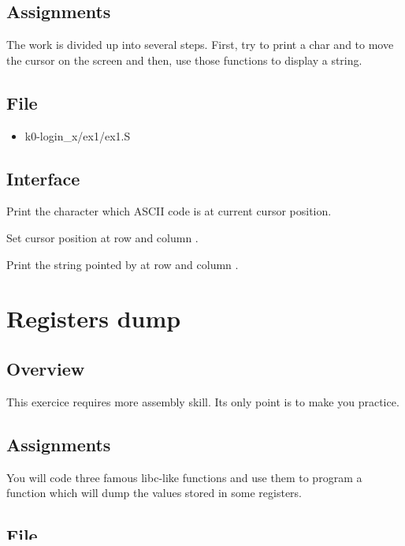 \subsection*{Assignments}
The work is divided up into several steps. First, try to print a char and
to move the cursor on the screen and then, use those functions to display
a string.

\subsection*{File}
\begin{itemize}
  \item k0-login\_x/ex1/ex1.S
\end{itemize}

\subsection*{Interface}
{
  Print the character which ASCII code is  at current cursor
  position.
}

{
  Set cursor position at row  and column .
}

{
  Print the string pointed by  at row  and
  column .
}

%
%

\newpage

\section{Registers dump}

\subsection*{Overview}
This exercice requires more assembly skill. Its only point is to make you
practice.

\subsection*{Assignments}
You will code three famous libc-like functions and use them to program
a function which will dump the values stored in some registers.

\subsection*{File}
\begin{itemize}
  \item k0-login\_x/ex2/ex2.S
\end{itemize}

